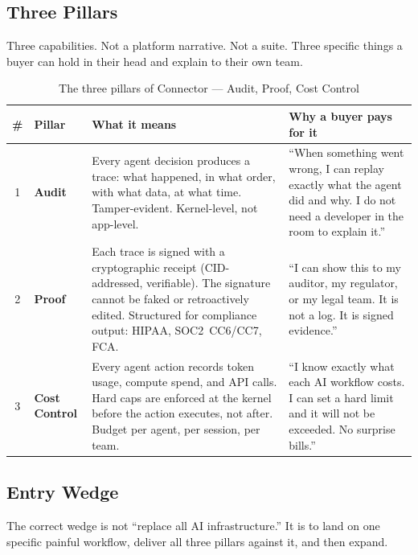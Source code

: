 \subsection{Three Pillars}

Three capabilities. Not a platform narrative. Not a suite. Three specific
things a buyer can hold in their head and explain to their own team.

\begin{table}[H]
\centering
\renewcommand{\arraystretch}{1.7}
\begin{tabularx}{\textwidth}{@{}clXX@{}}
\toprule
\textbf{\#} & \textbf{Pillar} & \textbf{What it means} & \textbf{Why a buyer pays for it} \\
\midrule
1 & \textbf{Audit} & Every agent decision produces a trace: what
  happened, in what order, with what data, at what time. Tamper-evident.
  Kernel-level, not app-level. & ``When something went wrong, I can replay
  exactly what the agent did and why. I do not need a developer in the room
  to explain it.'' \\
\midrule
2 & \textbf{Proof} & Each trace is signed with a cryptographic receipt
  (CID-addressed, verifiable). The signature cannot be faked or retroactively
  edited. Structured for compliance output: HIPAA, SOC2~CC6/CC7, FCA. & ``I
  can show this to my auditor, my regulator, or my legal team. It is not a
  log. It is signed evidence.'' \\
\midrule
3 & \textbf{Cost Control} & Every agent action records token usage,
  compute spend, and API calls. Hard caps are enforced at the kernel before
  the action executes, not after. Budget per agent, per session, per team. &
  ``I know exactly what each AI workflow costs. I can set a hard limit and
  it will not be exceeded. No surprise bills.'' \\
\bottomrule
\end{tabularx}
\caption{The three pillars of Connector --- Audit, Proof, Cost Control}
\end{table}

\subsection{Entry Wedge}

The correct wedge is not ``replace all AI infrastructure.'' It is to land on
one specific painful workflow, deliver all three pillars against it, and
then expand.

